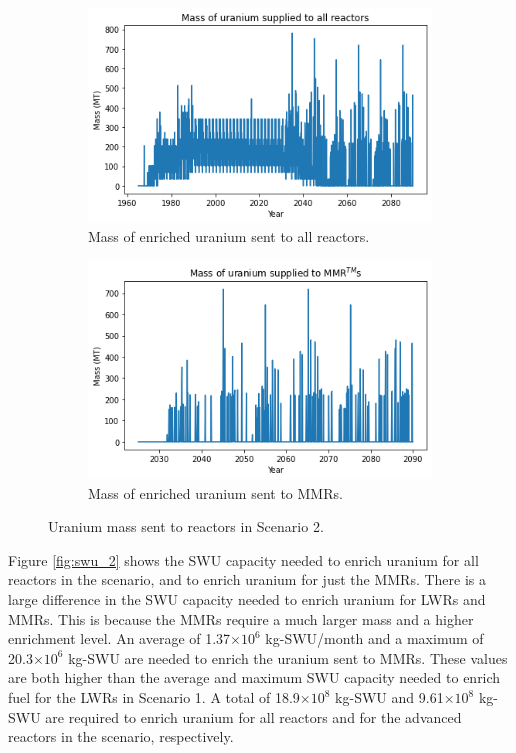 \begin{figure}
    \centering
    \begin{subfigure}{0.5\textwidth}
        \centering
        \includegraphics[scale=0.5]{../figures/fuelsupply_scenarios_2.png}
        \caption{Mass of enriched uranium sent to all reactors.}
        \label{fig:totalfuel_2}
    \end{subfigure}
    \hspace{0.8cm}
    \begin{subfigure}{0.5\textwidth}
        \centering
        \includegraphics[scale=0.5]{../figures/advancedRX_fuelsupply_scenarios_2.png}
        \caption{Mass of enriched uranium sent to \glspl{MMR}.}
        \label{fig:haleu_2}
    \end{subfigure}
    \caption{Uranium mass sent to reactors in Scenario 2.}
    \label{fig:fuel_2}
\end{figure}

Figure \ref{fig:swu_2} shows the \gls{SWU} capacity needed to 
enrich uranium for all reactors in the scenario, and to enrich uranium for 
just the \glspl{MMR}. There is a large difference in the \gls{SWU} 
capacity needed to enrich uranium for \glspl{LWR} and \glspl{MMR}. This 
is because the \glspl{MMR} require a much larger mass and 
a higher enrichment level. An average of 1.37$\times 10^6$ kg-\gls{SWU}/month
and a maximum of 20.3$\times 10^6$ kg-\gls{SWU}
are needed to enrich the uranium sent to \glspl{MMR}. These values are both 
higher than the 
average and maximum \gls{SWU} capacity needed to enrich fuel for the 
\glspl{LWR} in Scenario 1. A total of 18.9$\times 10^8$ kg-SWU and 9.61$\times 
10^8$ kg-SWU are required to enrich uranium for all reactors and for 
the advanced reactors in the scenario, respectively. 

